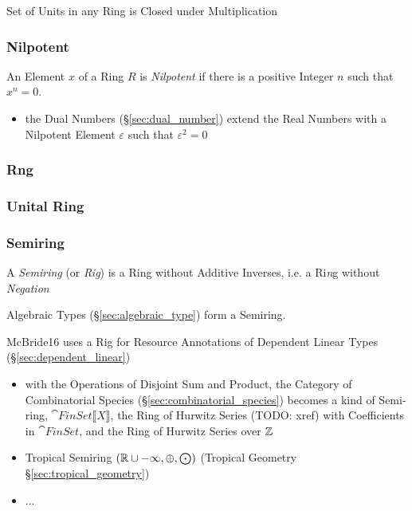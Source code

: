 Set of Units in any Ring is Closed under Multiplication



\subsubsection{Nilpotent}\label{sec:nilpotent}

An Element $x$ of a Ring $R$ is \emph{Nilpotent} if there is a positive Integer
$n$ such that $x^n = 0$.

\begin{itemize}
  \item the Dual Numbers (\S\ref{sec:dual_number}) extend the Real Numbers with
    a Nilpotent Element $\varepsilon$ such that $\varepsilon^2 = 0$
\end{itemize}



\subsubsection{Rng}\label{sec:rng}

\subsubsection{Unital Ring}\label{sec:unital_ring}

\subsubsection{Semiring}\label{sec:semiring}

A \emph{Semiring} (or \emph{Rig}) is a Ring without Additive Inverses,
i.e. a Ri\emph{n}g without \emph{Negation}

Algebraic Types (\S\ref{sec:algebraic_type}) form a Semiring.

McBride16 uses a Rig for Resource Annotations of Dependent Linear
Types (\S\ref{sec:dependent_linear})

\begin{itemize}
  \item with the Operations of Disjoint Sum and Product, the
    Category of Combinatorial Species (\S\ref{sec:combinatorial_species})
    becomes a kind of Semi-ring, $\cat{FinSet}\llbracket{X}\rrbracket$, the
    Ring of Hurwitz Series (TODO: xref) with Coefficients in $\cat{FinSet}$, and
    the Ring of Hurwitz Series over $\mathbb{Z}$
  \item Tropical Semiring $(\mathbb{R} \cup -\infty, \oplus, \bigodot)$ (Tropical
    Geometry \S\ref{sec:tropical_geometry})
  \item ...
\end{itemize}



